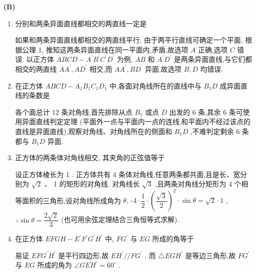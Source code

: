 \begin{center}  \textbf{(B)} \end{center}
\begin{enumerate}
    \item 分别和两条异面直线都相交的两直线一定是
    \begin{jieda}
        如果和两条异面直线都相交的两直线平行, 由于两平行直线可确定一个平面, 根据公理 1, 推知这两条异面直线在同一平面内,矛盾,故选项 $A$ 正确,选项 $C$ 错误. 以正方体 ${ABCD} - {A}^{\prime }{B}^{\prime }{C}^{\prime }{D}^{\prime }$ 为例, ${AB}$ 和 ${A}^{\prime }{D}^{\prime }$ 是两条异面直线,与它们都相交的两直线 $A{A}^{\prime },A{D}^{\prime }$ 相交,而 $A{A}^{\prime },B{D}^{\prime }$ 异面,故选项 $B,D$ 均错误.
    \end{jieda}
    \item 在正方体 ${ABCD} - {A}_{1}{B}_{1}{C}_{1}{D}_{1}$ 中,各面对角线所在的直线中与 ${B}_{1}D$ 成异面直线的条数是
    \begin{jieda}
        各个面总计 12 条对角线,首先排除从点 ${B}_{1}$ 或点 $D$ 出发的 6 条,其余 6 条可使用异面直线判定定理 (平面外一点与平面内一点的连线,和平面内不经过该点的直线是异面直线),观察对角线、对角线所在的侧面和 ${B}_{1}D$ ,不难判定剩余 6 条都与 ${B}_{1}D$ 异面.
    \end{jieda}
    \item 正方体的两条体对角线相交, 其夹角的正弦值等于 
    \begin{jieda}
        设正方体棱长为 1 . 正方体共有 4 条体对角线,任意两条都共面,且是长、宽分别为 $\sqrt{2}$ 、 1 的矩形的对角线. 对角线长 $\sqrt{3}$ ,且两条对角线分矩形为 4 个相等面积的三角形,设对角线所成角为 $\theta ,\therefore 4 \cdot  \dfrac{1}{2} \cdot  {\left( \dfrac{\sqrt{3}}{2}\right) }^{2} \cdot  \sin \theta  = \sqrt{2} \cdot  1$ ,
        $\therefore \sin \theta  = \dfrac{2\sqrt{2}}{3}$ (也可用余弦定理结合三角恒等式求解).
    \end{jieda}
    \item 在正方体 ${EFGH} - {E}^{\prime }{F}^{\prime }{G}^{\prime }{H}^{\prime }$ 中, $F{G}^{\prime }$ 与 ${EG}$ 所成的角等于 
    \begin{jieda}
        易证 ${EF}{G}^{\prime }{H}^{\prime }$ 是平行四边形,故 $E{H}^{\prime }//F{G}^{\prime }$ . 而 $\bigtriangleup {EG}{H}^{\prime }$ 是等边三角形,故 $F{G}^{\prime }$ 与 ${EG}$ 所成的角为 $\angle {GE}{H}^{\prime } = {60}^{ \circ  }$ .

\end{jieda}
\end{enumerate}
